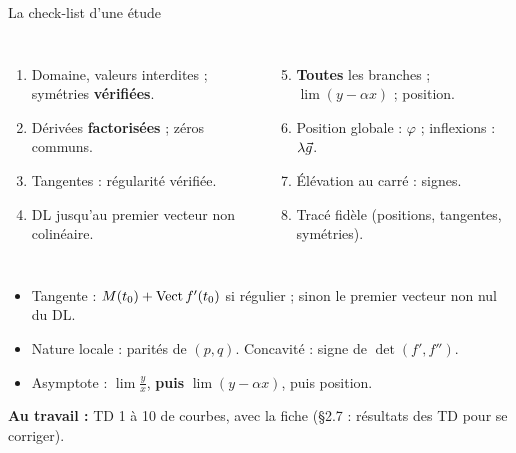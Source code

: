 \documentclass[aspectratio=169,11pt]{beamer}
\begin{document}
\begin{frame}{La check-list d'une étude}
\begin{columns}[T]
\begin{enumerate}
\item Domaine, valeurs interdites ; symétries \textbf{vérifiées}.
\item Dérivées \textbf{factorisées} ; zéros communs.
\item Tangentes : régularité vérifiée.
\item DL jusqu'au premier vecteur non colinéaire.
\end{enumerate}
\begin{enumerate}\setcounter{enumi}{4}
\item \textbf{Toutes} les branches ; $\lim(y-\alpha x)$ ; position.
\item Position globale : $\varphi$ ; inflexions : $\lambda\vec{g}$.
\item Élévation au carré : signes.
\item Tracé fidèle (positions, tangentes, symétries).
\end{enumerate}
\end{columns}
\pause
\begin{RETENIR}
\begin{itemize}
\item Tangente : $M(t_0)+\operatorname{Vect} f'(t_0)$ si régulier ; sinon le premier vecteur non nul du DL.
\item Nature locale : parités de $(p,q)$. \quad Concavité : signe de $\det(f',f'')$.
\item Asymptote : $\lim\frac yx$, \textbf{puis} $\lim(y-\alpha x)$, puis position.
\end{itemize}
\end{RETENIR}
\pause
\textbf{Au travail :} TD 1 à 10 de courbes, avec la fiche (§2.7 : résultats des TD pour se corriger).
\end{frame}
\end{document}
